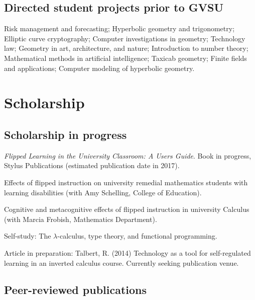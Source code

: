 \documentclass[letterpaper]{article}
\renewenvironment{itemize}{
  \begin{list}{}{
    \setlength{\leftmargin}{1.5em}
	\setlength{\itemsep}{0in}
  }
}{
  \end{list}
}
\begin{document}
\subsection*{Directed student projects prior to GVSU}

Risk management and forecasting; Hyperbolic geometry and trigonometry; Elliptic curve cryptography; Computer investigations in geometry; Technology law; Geometry in art, architecture, and nature; Introduction to number theory; Mathematical methods in artificial intelligence; Taxicab geometry; Finite fields and applications; Computer modeling of hyperbolic geometry. 


\section*{Scholarship}

\subsection*{Scholarship in progress}
\begin{itemize}
	\item \emph{Flipped Learning in the University Classroom: A Users Guide}. Book in progress, Stylus Publications (estimated publication date in 2017).  
	\item Effects of flipped instruction on university remedial mathematics students with learning disabilities (with Amy Schelling, College of Education). 
	\item Cognitive and metacognitive effects of flipped instruction in university Calculus (with Marcia Frobish, Mathematics Department). 
	\item Self-study: The $\lambda$-calculus, type theory, and functional programming. 
	\item Article in preparation: Talbert, R. (2014) Technology as a tool for self-regulated learning in an inverted calculus course. Currently seeking publication venue.  
\end{itemize}


\subsection*{Peer-reviewed publications}
\end{document}
